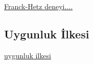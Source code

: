 \documentclass[a4paper,12pt, twoside]{article}
\begin{document}
\vspace{12pt}

\href{http://hyperphysics.phy-astr.gsu.edu/hbase/FrHz.html}{Franck-Hetz deneyi.... }


\subsection{Uygunluk İlkesi}
\href{http://hyperphysics.phy-astr.gsu.edu/hbase/quantum/hosc6.html}{uygunluk ilkesi}









\newpage
\renewcommand\refname{Kaynaklar}
{}
 
\end{document}
